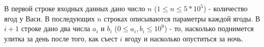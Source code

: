 В первой строке входных данных дано число $n$ ($1 \le n \le 5 * 10 ^ 5$)  - количество ягод у Васи.
В последующих $n$ строках описываются параметры каждой ягоды. 
В $i + 1$ строке дано два числа $a_i$ и $b_i$  ($0 \le a_i, b_i \le 10 ^ 9$) - то, насколько поднимется улитка за день после того, как съест $i$ ягоду и насколько опуститься за ночь.